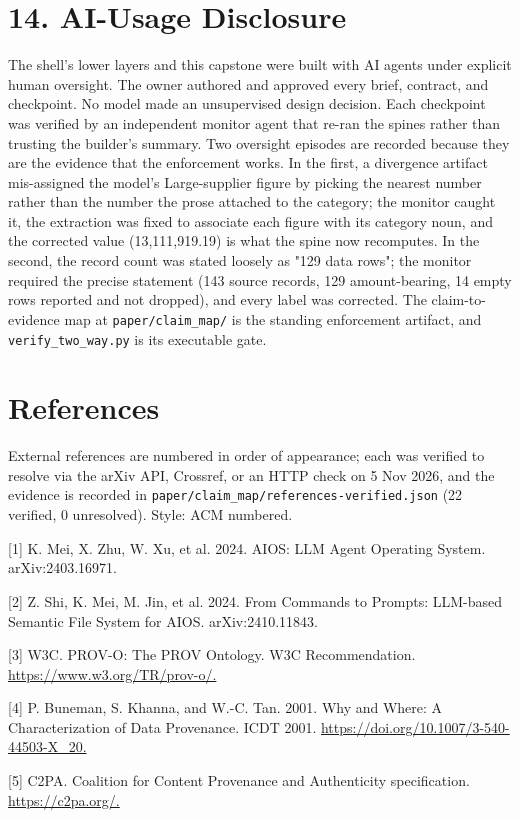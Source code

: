 \documentclass[11pt,a4paper]{article}
\begin{document}
\section*{14. AI-Usage Disclosure}
The shell's lower layers and this capstone were built with AI agents under explicit human oversight. The owner authored and approved every brief, contract, and checkpoint. No model made an unsupervised design decision. Each checkpoint was verified by an independent monitor agent that re-ran the spines rather than trusting the builder's summary. Two oversight episodes are recorded because they are the evidence that the enforcement works. In the first, a divergence artifact mis-assigned the model's Large-supplier figure by picking the nearest number rather than the number the prose attached to the category; the monitor caught it, the extraction was fixed to associate each figure with its category noun, and the corrected value (13,111,919.19) is what the spine now recomputes. In the second, the record count was stated loosely as "129 data rows"; the monitor required the precise statement (143 source records, 129 amount-bearing, 14 empty rows reported and not dropped), and every label was corrected. The claim-to-evidence map at \texttt{paper/claim\_map/} is the standing enforcement artifact, and \texttt{verify\_two\_way.py} is its executable gate.

\section*{References}
External references are numbered in order of appearance; each was verified to resolve via the arXiv API, Crossref, or an HTTP check on 5 Nov 2026, and the evidence is recorded in \texttt{paper/claim\_map/references-verified.json} (22 verified, 0 unresolved). Style: ACM numbered.

[1] K. Mei, X. Zhu, W. Xu, et al. 2024. AIOS: LLM Agent Operating System. arXiv:2403.16971.

[2] Z. Shi, K. Mei, M. Jin, et al. 2024. From Commands to Prompts: LLM-based Semantic File System for AIOS. arXiv:2410.11843.

[3] W3C. PROV-O: The PROV Ontology. W3C Recommendation. \url{https://www.w3.org/TR/prov-o/.}

[4] P. Buneman, S. Khanna, and W.-C. Tan. 2001. Why and Where: A Characterization of Data Provenance. ICDT 2001. \url{https://doi.org/10.1007/3-540-44503-X\_20.}

[5] C2PA. Coalition for Content Provenance and Authenticity specification. \url{https://c2pa.org/.}
\end{document}
